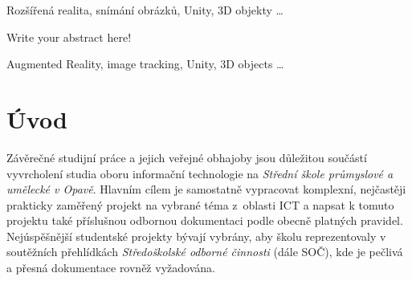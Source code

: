 \documentclass[12pt, a4paper,
twoside,        %
openright
]{report}
\begin{document}
	\vspace{18pt}
	
	
	\noindent Rozšířená realita, snímání obrázků, Unity, 3D objekty \dots 
	
	\vspace{18pt}

	
	\noindent Write your abstract here! \lipsum[1] %
	
	\vspace{18pt}
	
	
	\noindent Augmented Reality, image tracking, Unity, 3D objects \dots 
	
	\clearpage %

	
	\tableofcontents %

	\setcounter{page}{1} %

	\chapter*{Úvod}
Závěrečné studijní práce a jejich veřejné obhajoby jsou důležitou součástí vyvrcholení studia oboru informační technologie na \textit{Střední škole průmyslové a umělecké v Opavě}. Hlavním cílem je samostatně vypracovat komplexní, nejčastěji prakticky zaměřený projekt na vybrané téma z~oblasti ICT a napsat k tomuto projektu také příslušnou odbornou dokumentaci podle obecně platných pravidel. Nejúspěšnější studentské projekty bývají vybrány, aby školu reprezentovaly v soutěžních přehlídkách \emph{Středoškolské odborné činnosti} (dále SOČ), kde je pečlivá a přesná dokumentace rovněž vyžadována.
\end{document}
